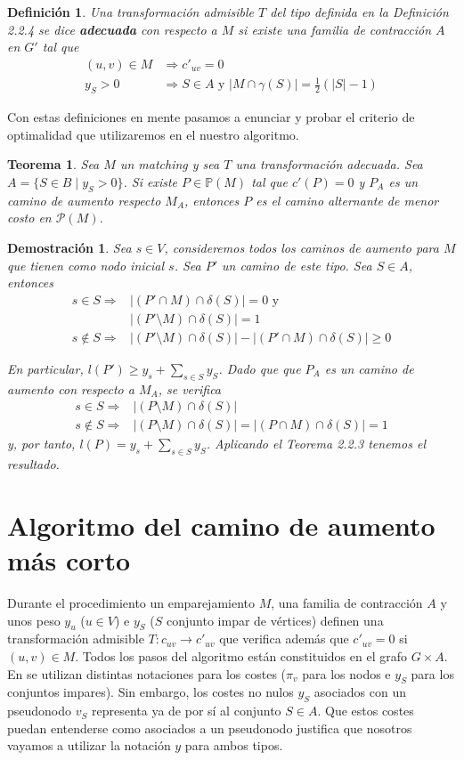 \documentclass[twoside,a4paper,openright,12pt,tikz]{book}
\newtheorem{defi}{Definici\'on}[section]
\newtheorem{thm}{Teorema}[section]
\newtheorem*{dem}{Demostración}
\begin{document}
\begin{defi}
Una transformación admisible $T$ del tipo definida en la Definición 2.2.4 se dice \textbf{adecuada} con respecto a $M$ si existe una familia de contracción $A$ en $G'$ tal que
\begin{align*}
(u,v)\in M &\Rightarrow c'_{uv} = 0\\
y_S>0&\Rightarrow S\in A \text{ y } |M\cap \gamma(S)| = \frac{1}{2}(|S|-1)
\end{align*}
\end{defi}
Con estas definiciones en mente pasamos a enunciar y probar el criterio de optimalidad que utilizaremos en el nuestro algoritmo.
\begin{thm}
Sea $M$ un matching y sea $T$ una transformación adecuada. Sea $A = \{S \in B\mid y_S>0\}$. Si existe $P\in \mathbb{P}(M)$ tal que $c'(P)=0$ y $P_A$ es un camino de aumento respecto $M_A$, entonces $P$ es el camino alternante de menor costo en $\mathcal{P}(M)$.
\end{thm}
\begin{dem}
Sea $s\in V$, consideremos todos los caminos de aumento para $M$ que tienen como nodo inicial $s$. Sea $P'$ un camino de este tipo. Sea $S\in A$, entonces
\begin{align*}
s\in S \Rightarrow & |(P'\cap M)\cap \delta(S)| = 0 \text{ y}\\
& |(P'\setminus M)\cap \delta(S)| = 1\\
s\notin S \Rightarrow & |(P'\setminus M)\cap \delta(S)| - |(P'\cap M)\cap \delta(S)| \geq 0
\end{align*}

En particular, $l(P')\geq y_s + \sum_{s\in S}y_S$. Dado que que $P_A$  es un camino de aumento con respecto a $M_A$, se verifica
\begin{align*}
s\in S \Rightarrow & |(P\setminus M)\cap \delta(S)|\\
s\notin S \Rightarrow & |(P\setminus M)\cap \delta(S)| = |(P\cap M)\cap \delta(S)| =1
\end{align*}
y, por tanto, $l(P) = y_s  + \sum_{s\in S} y_S$. Aplicando el Teorema 2.2.3 tenemos el resultado.
\end{dem}
\section{Algoritmo del camino de aumento más corto}
Durante el procedimiento un emparejamiento $M$, una familia de contracción $A$ y unos peso $y_u$ ($u \in V$) e $y_S$ ($S$ conjunto impar de vértices) definen una transformación admisible $T:c_{uv}\to c'_{uv}$ que verifica además que $c'_{uv}=0$ si $(u,v)\in M$. Todos los pasos del algoritmo están constituidos en el grafo $G\times A$. En \cite{inte} se utilizan distintas notaciones para los costes ($\pi_v$ para los nodos e $y_S$ para los conjuntos impares). Sin embargo, los costes no nulos $y_S$ asociados con un pseudonodo $v_S$ representa ya de por sí al conjunto $S\in A$. Que estos costes puedan entenderse como asociados a un pseudonodo justifica que nosotros vayamos a utilizar la notación $y$ para ambos tipos. 
\end{document}
